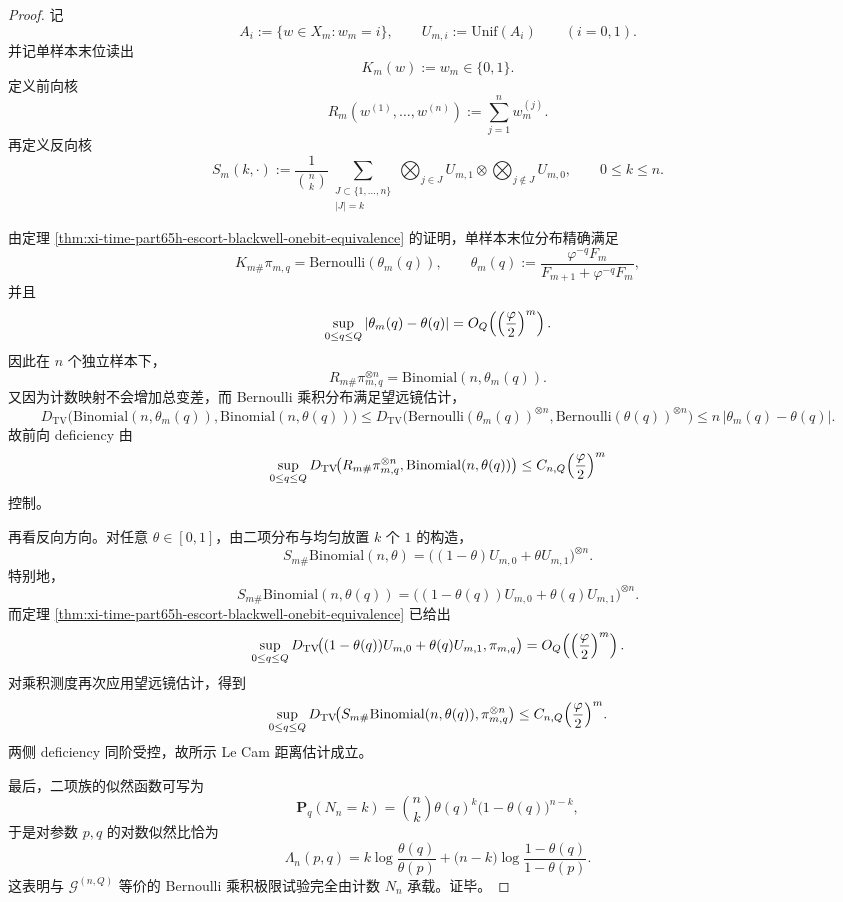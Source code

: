 \begin{proof}
记
\[
A_i:=\{w\in X_m:w_m=i\},
\qquad
U_{m,i}:=\mathrm{Unif}(A_i)
\qquad (i=0,1).
\]
并记单样本末位读出
\[
K_m(w):=w_m\in\{0,1\}.
\]
定义前向核
\[
R_m(w^{(1)},\dots,w^{(n)})
:=
\sum_{j=1}^n w_m^{(j)}.
\]
再定义反向核
\[
S_m(k,\cdot)
:=
\frac{1}{\binom{n}{k}}
\sum_{\substack{J\subset\{1,\dots,n\}\\ |J|=k}}
\bigotimes_{j\in J}U_{m,1}
\otimes
\bigotimes_{j\notin J}U_{m,0},
\qquad 0\le k\le n.
\]

由定理 \ref{thm:xi-time-part65h-escort-blackwell-onebit-equivalence} 的证明，单样本末位分布精确满足
\[
K_{m\#}\pi_{m,q}=\mathrm{Bernoulli}(\theta_m(q)),
\qquad
\theta_m(q):=
\frac{\varphi^{-q}F_m}{F_{m+1}+\varphi^{-q}F_m},
\]
并且
\[
\sup_{0\le q\le Q}|\theta_m(q)-\theta(q)|
=
O_Q\!\left(\Bigl(\frac{\varphi}{2}\Bigr)^m\right).
\]
因此在 \(n\) 个独立样本下，
\[
R_{m\#}\pi_{m,q}^{\otimes n}
=
\mathrm{Binomial}(n,\theta_m(q)).
\]
又因为计数映射不会增加总变差，而 Bernoulli 乘积分布满足望远镜估计，
\[
D_{\mathrm{TV}}\!\bigl(
\mathrm{Binomial}(n,\theta_m(q)),
\mathrm{Binomial}(n,\theta(q))
\bigr)
\le
D_{\mathrm{TV}}\!\bigl(
\mathrm{Bernoulli}(\theta_m(q))^{\otimes n},
\mathrm{Bernoulli}(\theta(q))^{\otimes n}
\bigr)
\le
n\,|\theta_m(q)-\theta(q)|.
\]
故前向 deficiency 由
\[
\sup_{0\le q\le Q}
D_{\mathrm{TV}}\!\bigl(R_{m\#}\pi_{m,q}^{\otimes n},\mathrm{Binomial}(n,\theta(q))\bigr)
\le
C_{n,Q}\Bigl(\frac{\varphi}{2}\Bigr)^m
\]
控制。

再看反向方向。对任意 \(\theta\in[0,1]\)，由二项分布与均匀放置 \(k\) 个 \(1\) 的构造，
\[
S_{m\#}\mathrm{Binomial}(n,\theta)
=
\bigl((1-\theta)U_{m,0}+\theta U_{m,1}\bigr)^{\otimes n}.
\]
特别地，
\[
S_{m\#}\mathrm{Binomial}(n,\theta(q))
=
\bigl((1-\theta(q))U_{m,0}+\theta(q)U_{m,1}\bigr)^{\otimes n}.
\]
而定理 \ref{thm:xi-time-part65h-escort-blackwell-onebit-equivalence} 已给出
\[
\sup_{0\le q\le Q}
D_{\mathrm{TV}}\!\bigl(
(1-\theta(q))U_{m,0}+\theta(q)U_{m,1},
\pi_{m,q}
\bigr)
=
O_Q\!\left(\Bigl(\frac{\varphi}{2}\Bigr)^m\right).
\]
对乘积测度再次应用望远镜估计，得到
\[
\sup_{0\le q\le Q}
D_{\mathrm{TV}}\!\bigl(
S_{m\#}\mathrm{Binomial}(n,\theta(q)),
\pi_{m,q}^{\otimes n}
\bigr)
\le
C_{n,Q}\Bigl(\frac{\varphi}{2}\Bigr)^m.
\]
两侧 deficiency 同阶受控，故所示 Le Cam 距离估计成立。

最后，二项族的似然函数可写为
\[
\mathbf P_q(N_n=k)
=
\binom{n}{k}\theta(q)^k\bigl(1-\theta(q)\bigr)^{n-k},
\]
于是对参数 \(p,q\) 的对数似然比恰为
\[
\Lambda_n(p,q)
=
k\log\frac{\theta(q)}{\theta(p)}
+
\bigl(n-k\bigr)\log\frac{1-\theta(q)}{1-\theta(p)}.
\]
这表明与 \(\mathcal G^{(n,Q)}\) 等价的 Bernoulli 乘积极限试验完全由计数 \(N_n\) 承载。证毕。
\end{proof}



\endinput
